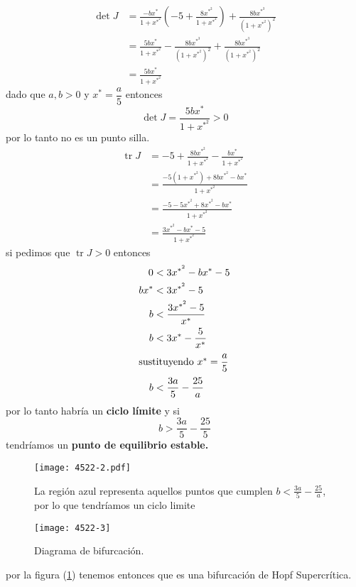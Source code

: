 \begin{align*}
  \operatorname{det} J &= \frac{-b x^*}{1+x^{{*}^2}} \left( -5 + \frac{8x^{{*}^2}}{1+x^{{*}^2}} \right) + \frac{8bx^{{*}^3}}{(1+x^{{*}^2})^2}  \\
  &= \frac{5bx^*}{1+x^{{*}^2}}-\frac{8bx^{{*}^3}}{(1+x^{{*}^2})^2} + \frac{8bx^{{*}^3}}{(1+x^{{*}^2})^2} \\
  &= \frac{5bx^*}{1+x^{{*}^2}}
\end{align*}
dado que $a,b>0$ y $x^*=\dfrac{a}{5}$ entonces
\begin{equation*}
  \operatorname{det} J=\frac{5bx^*}{1+x^{{*}^2}} > 0 
\end{equation*}
por lo tanto no es un punto silla.
\begin{align*}                      
  \operatorname{tr}J &= -5+\frac{8bx^{{*}^2}}{1+x^{{*}^2}} - \frac{bx^*}{1+x^{{*}^2}} \\
  &=\frac{-5(1+x^{{*}^2})+8bx^{{*}^2}-bx^*}{1+x^{{*}^2}} \\
  &=\frac{-5 -5x^{{*}^2}+8x^{{*}^2}-bx^*}{1+x^{{*}^2}} \\
  &=\frac{3x^{{*}^2}-bx^*-5}{1+x^{{*}^2}}
\end{align*}
si pedimos que $\operatorname{tr}J>0$ entonces
\begin{align*}
   0 &< 3x^{{*}^2}-bx^*-5 \\
  bx^*&<3x^{{*}^2}-5 \\
  b&<\frac{3x^{{*}^2}-5}{x^*} \\
  b&<3x^*-\frac{5}{x^*} \\
  \intertext{sustituyendo $x^*=\dfrac{a}{5}$} 
  b&<\frac{3a}{5}-\frac{25}{a}
\end{align*}
por lo tanto habría un \textbf{ciclo límite} y si $$b>\dfrac{3a}{5}-\dfrac{25}{5}$$ tendríamos un \textbf{punto de equilibrio estable.}
\begin{figure}[H]
  \centering
  \texttt{[image: 4522-2.pdf]}
  \caption{La región azul representa aquellos puntos que cumplen $b<\frac{3a}{5}-\frac{25}{a}$, por lo que tendríamos un ciclo limite}
\end{figure}
\begin{figure}[H]  
  \centering
  \texttt{[image: 4522-3]} 
  \caption{Diagrama de bifurcación.}
    \label{4522-3}
\end{figure}
por la figura (\ref{4522-3}) tenemos entonces que es una bifurcación de Hopf Supercrítica.  
\begin{figure}[H]
 \centering
  \subfloat[$b<b_c$]{
    \texttt{[image: 4522-4]}}
  \subfloat[$b>b_c$]{
    \texttt{[image: 4522-5]}}
\end{figure} 


